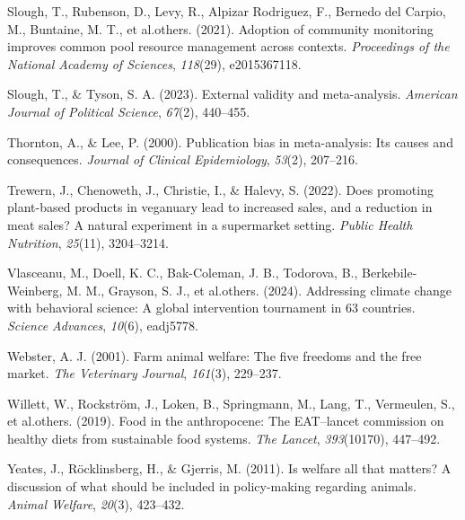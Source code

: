 \documentclass[
  man]{apa6}
\newlength{\cslhangindent}
\newenvironment{CSLReferences}[2] %
 {\begin{list}{}{%
  \setlength{\itemindent}{0pt}
  \setlength{\leftmargin}{0pt}
  \setlength{\parsep}{0pt}
  \ifodd #1
   \setlength{\leftmargin}{\cslhangindent}
   \setlength{\itemindent}{-1\cslhangindent}
  \fi
  \setlength{\itemsep}{#2\baselineskip}}}
 {\end{list}}
\begin{document}
\begin{CSLReferences}{1}{0}
Slough, T., Rubenson, D., Levy, R., Alpizar Rodriguez, F., Bernedo del Carpio, M., Buntaine, M. T., et al.others. (2021). Adoption of community monitoring improves common pool resource management across contexts. \emph{Proceedings of the National Academy of Sciences}, \emph{118}(29), e2015367118.

Slough, T., \& Tyson, S. A. (2023). External validity and meta-analysis. \emph{American Journal of Political Science}, \emph{67}(2), 440--455.

Thornton, A., \& Lee, P. (2000). Publication bias in meta-analysis: Its causes and consequences. \emph{Journal of Clinical Epidemiology}, \emph{53}(2), 207--216.

Trewern, J., Chenoweth, J., Christie, I., \& Halevy, S. (2022). Does promoting plant-based products in veganuary lead to increased sales, and a reduction in meat sales? A natural experiment in a supermarket setting. \emph{Public Health Nutrition}, \emph{25}(11), 3204--3214.

Vlasceanu, M., Doell, K. C., Bak-Coleman, J. B., Todorova, B., Berkebile-Weinberg, M. M., Grayson, S. J., et al.others. (2024). Addressing climate change with behavioral science: A global intervention tournament in 63 countries. \emph{Science Advances}, \emph{10}(6), eadj5778.

Webster, A. J. (2001). Farm animal welfare: The five freedoms and the free market. \emph{The Veterinary Journal}, \emph{161}(3), 229--237.

Willett, W., Rockström, J., Loken, B., Springmann, M., Lang, T., Vermeulen, S., et al.others. (2019). Food in the anthropocene: The EAT--lancet commission on healthy diets from sustainable food systems. \emph{The Lancet}, \emph{393}(10170), 447--492.

Yeates, J., Röcklinsberg, H., \& Gjerris, M. (2011). Is welfare all that matters? A discussion of what should be included in policy-making regarding animals. \emph{Animal Welfare}, \emph{20}(3), 423--432.

\end{CSLReferences}
\end{document}

